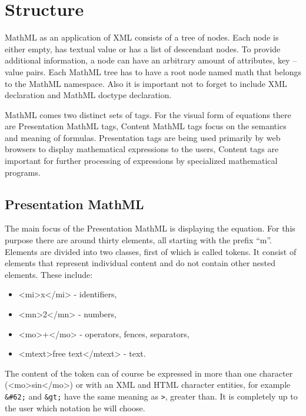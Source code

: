 \documentclass[11pt,oneside,final]{fithesis2}
\begin{document}
\section{Structure}
MathML as an application of XML consists of a tree of nodes. Each node is either empty, has textual value or has a list of descendant nodes. To provide additional information, a node can have an arbitrary amount of attributes, key – value pairs. Each MathML tree has to have a root node named math that belongs to the MathML namespace. Also it is important not to forget to include XML declaration and MathML doctype declaration. 

MathML comes two distinct sets of tags. For the visual form of equations there are Presentation MathML tags, Content MathML tags focus on the semantics and meaning of formulas. Presentation tags are being used primarily by web browsers to display mathematical expressions to the users, Content tags are important for further processing of expressions by specialized mathematical programs.

\subsection{Presentation MathML}
The main focus of the Presentation MathML is displaying the equation. For this purpose there are around thirty elements, all starting with the prefix “m”. Elements are divided into two classes, first of which is called tokens. It consist of elements that represent individual content and do not contain other nested elements. These include: 
\begin{itemize}
\item <mi>x</mi> - identifiers,
\item <mn>2</mn> - numbers,
\item <mo>+</mo> - operators, fences, separators,
\item <mtext>free text</mtext> - text.
\end{itemize}
The content of the token can of course be expressed in more than one character (<mo>sin</mo>) or with an XML and HTML character entities, for example \texttt{\&\#62;} and \texttt{\&gt;} have the same meaning as \texttt{>}, greater than. It is completely up to the user which notation he will choose.
\end{document}
